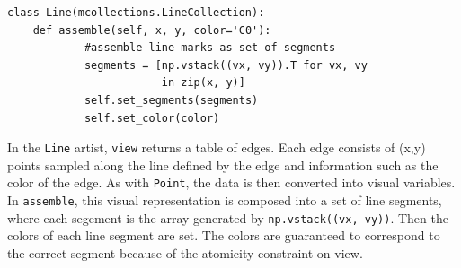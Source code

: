 \documentclass[../main.tex]{subfiles}
\begin{document}
\begin{verbatim}
class Line(mcollections.LineCollection):
    def assemble(self, x, y, color='C0'):
            #assemble line marks as set of segments 
            segments = [np.vstack((vx, vy)).T for vx, vy 
                        in zip(x, y)]
            self.set_segments(segments)
            self.set_color(color)
\end{verbatim}
In the \texttt{Line} artist, \texttt{view} returns a table of edges. Each edge consists of (x,y) points sampled along the line defined by the edge and information such as the color of the edge. As with \texttt{Point}, the data is then converted into visual variables. In \texttt{assemble}, this visual representation is composed into a set of line segments, where each segement is the array generated by \texttt{np.vstack((vx, vy))}. Then the colors of each line segment are set. The colors are guaranteed to correspond to the correct segment because of the atomicity constraint on view. 
\end{document}
